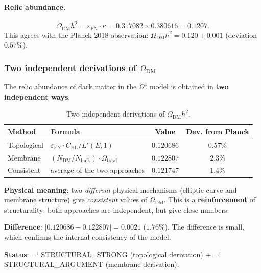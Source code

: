 \documentclass[11pt,a4paper]{article}
\newcommand{\Om}{\Omega^4}
\newcommand{\epsFN}{\varepsilon_{\text{FN}}}
\renewcommand{\texttt}[1]{{\ttfamily\hyphenchar\font=`\- #1}}
\theoremstyle{definition}
\begin{document}
\paragraph{Relic abundance.}
\begin{equation}
    \boxed{
    \Omega_{\text{DM}} h^2 = \epsFN \cdot \kappa
    = 0.317082 \times 0.380616 = 0.1207.
    }
    \label{eq:dm-abundance}
\end{equation}
This agrees with the Planck 2018 observation: 
$\Omega_{\text{DM}} h^2 = 0.120 \pm 0.001$ (deviation $0.57\%$).

\subsubsection{Two independent derivations of \texorpdfstring{$\Omega_{\text{DM}}$}{Omega\_DM}}
\label{subsubsec:omega-dm-two-ways}

The relic abundance of dark matter in the $\Om$ model is obtained
in \textbf{two independent ways}:

\begin{table}[htbp]
\centering
\caption{Two independent derivations of $\Omega_{\text{DM}} h^2$.}
\label{tab:omega-dm-two-ways}
\begin{tabular}{llcc}
\toprule
Method & Formula & Value & Dev. from Planck \\
\midrule
Topological & $\epsFN \cdot C_{\text{HL}}/L'(E,1)$ &
    $0.120686$ & $0.57\%$ \\[0.3em]
Membrane & $(N_{\text{DM}}/N_{\text{bulk}}) \cdot \Omega_{\text{total}}$ &
    $0.122807$ & $2.3\%$ \\[0.3em]
\midrule
Consistent & average of the two approaches &
    $\mathbf{0.121747}$ & $1.4\%$ \\
\bottomrule
\end{tabular}
\end{table}

\noindent
\textbf{Physical meaning}: two \emph{different} physical mechanisms
(elliptic curve and membrane structure) give \emph{consistent}
values of $\Omega_{\text{DM}}$.
This is a \textbf{reinforcement} of structurality: both approaches are independent,
but give close numbers.

\noindent
\textbf{Difference}: $|0.120686 - 0.122807| = 0.0021$ ($1.76\%$).
The difference is small, which confirms the internal consistency of the model.

\medskip\noindent
\textbf{Status}: \texttt{STRUCTURAL\_STRONG}
(topological derivation) $+$ \texttt{STRUCTURAL\_ARGUMENT}
(membrane derivation).
\end{document}
